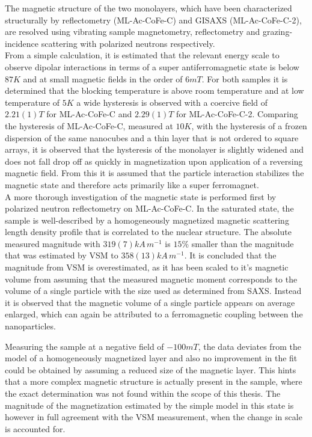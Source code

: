 \documentclass[\main/dresen_thesis.tex]{subfiles}
\begin{document}
  The magnetic structure of the two monolayers, which have been characterized structurally by reflectometry (ML-Ac-CoFe-C) and GISAXS (ML-Ac-CoFe-C-2), are resolved using vibrating sample magnetometry, reflectometry and grazing-incidence scattering with polarized neutrons respectively.
  \\

  From a simple calculation, it is estimated that the relevant energy scale to observe dipolar interactions in terms of a super antiferromagnetic state is below $87 \unit{K}$ and at small magnetic fields in the order of $6 \unit{mT}$.
  For both samples it is determined that the blocking temperature is above room temperature and at low temperature of $5 \unit{K}$ a wide hysteresis is observed with a coercive field of $2.21(1) \unit{T}$ for ML-Ac-CoFe-C and $2.29(1) \unit{T}$ for ML-Ac-CoFe-C-2.
  Comparing the hysteresis of ML-Ac-CoFe-C, measured at $10 \unit{K}$, with the hysteresis of a frozen dispersion of the same nanocubes and a thin layer that is not ordered to square arrays, it is observed that the hysteresis of the monolayer is slightly widened and does not fall drop off as quickly in magnetization upon application of a reversing magnetic field.
  From this it is assumed that the particle interaction stabilizes the magnetic state and therefore acts primarily like a super ferromagnet.
  \\
  A more thorough investigation of the magnetic state is performed first by polarized neutron reflectometry on ML-Ac-CoFe-C.
  In the saturated state, the sample is well-described by a homogeneously magnetized magnetic scattering length density profile that is correlated to the nuclear structure.
  The absolute measured magnitude with $319(7) \unit{kA \, m^{-1}}$ is $15 \%$ smaller than the magnitude that was estimated by VSM to $358(13) \unit{kA \, m^{-1}}$.
  It is concluded that the magnitude from VSM is overestimated, as it has been scaled to it's magnetic volume from assuming that the measured magnetic moment corresponds to the volume of a single particle with the size used as determined from SAXS.
  Instead it is observed that the magnetic volume of a single particle appears on average enlarged, which can again be attributed to a ferromagnetic coupling between the nanoparticles.

  Measuring the sample at a negative field of $-100 \unit{mT}$, the data deviates from the model of a homogeneously  magnetized layer and also no improvement in the fit could be obtained by assuming a reduced size of the magnetic layer.
  This hints that a more complex magnetic structure is actually present in the sample, where the exact determination was not found within the scope of this thesis.
  The magnitude of the magnetization estimated by the simple model in this state is however in full agreement with the VSM measurement, when the change in scale is accounted for.
  \\
\end{document}
